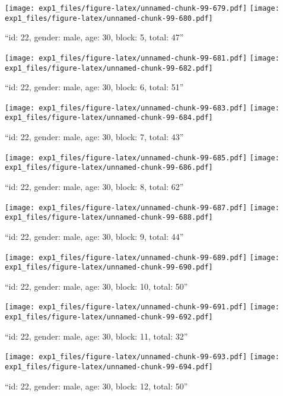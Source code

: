 \documentclass[,]{article}
\begin{document}
\texttt{[image: exp1\_files/figure-latex/unnamed-chunk-99-679.pdf]}
\texttt{[image: exp1\_files/figure-latex/unnamed-chunk-99-680.pdf]}

\newpage
[1] 

``id: 22, gender: male, age: 30, block: 5, total: 47''

\texttt{[image: exp1\_files/figure-latex/unnamed-chunk-99-681.pdf]}
\texttt{[image: exp1\_files/figure-latex/unnamed-chunk-99-682.pdf]}

\newpage
[1] 

``id: 22, gender: male, age: 30, block: 6, total: 51''

\texttt{[image: exp1\_files/figure-latex/unnamed-chunk-99-683.pdf]}
\texttt{[image: exp1\_files/figure-latex/unnamed-chunk-99-684.pdf]}

\newpage
[1] 

``id: 22, gender: male, age: 30, block: 7, total: 43''

\texttt{[image: exp1\_files/figure-latex/unnamed-chunk-99-685.pdf]}
\texttt{[image: exp1\_files/figure-latex/unnamed-chunk-99-686.pdf]}

\newpage
[1] 

``id: 22, gender: male, age: 30, block: 8, total: 62''

\texttt{[image: exp1\_files/figure-latex/unnamed-chunk-99-687.pdf]}
\texttt{[image: exp1\_files/figure-latex/unnamed-chunk-99-688.pdf]}

\newpage
[1] 

``id: 22, gender: male, age: 30, block: 9, total: 44''

\texttt{[image: exp1\_files/figure-latex/unnamed-chunk-99-689.pdf]}
\texttt{[image: exp1\_files/figure-latex/unnamed-chunk-99-690.pdf]}

\newpage
[1] 

``id: 22, gender: male, age: 30, block: 10, total: 50''

\texttt{[image: exp1\_files/figure-latex/unnamed-chunk-99-691.pdf]}
\texttt{[image: exp1\_files/figure-latex/unnamed-chunk-99-692.pdf]}

\newpage
[1] 

``id: 22, gender: male, age: 30, block: 11, total: 32''

\texttt{[image: exp1\_files/figure-latex/unnamed-chunk-99-693.pdf]}
\texttt{[image: exp1\_files/figure-latex/unnamed-chunk-99-694.pdf]}

\newpage
[1] 

``id: 22, gender: male, age: 30, block: 12, total: 50''
\end{document}
